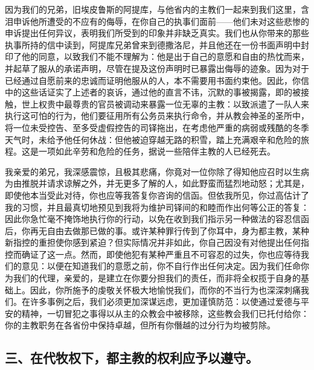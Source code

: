 因为我们的兄弟，旧埃皮鲁斯的阿提库，与他省内的主教们一起来到我们这里，含泪申诉他所遭受的不应有的侮辱，在你自己的执事们面前——他们未对这些悲惨的申诉提出任何异议，表明我们所受到的印象并非缺乏真实。我们也从你带来的那些执事所持的信中读到，阿提库兄弟曾来到德撒洛尼，并且他还在一份书面声明中封印了他的同意，以致我们不能不理解为：他是出于自己的意愿和自由的热忱而来，并起草了服从的承诺声明，尽管在提及这份声明时已暴露出侮辱的迹象。因为对于已经通过自愿前来的忠诚而证明他服从的人，本不需要用书面约束他。因此，你信中的这些话证实了上述者的哀诉，通过他的直言不讳，沉默的事被揭露，即的被接触，世上权贵中最尊贵的官员被调动来暴露一位无辜的主教：以致派遣了一队人来执行这可怕的行为，他们要征用所有公务员来执行命令，并从教会神圣的圣所中，将一位未受控告、至多受虚假控告的司铎拖出，在考虑他严重的病弱或残酷的冬季天气时，未给予他任何休战：但他被迫穿越无路的积雪，踏上充满艰辛和危险的旅程。这是一项如此辛劳和危险的任务，据说一些陪伴主教的人已经死去。\par

我亲爱的弟兄，我深感震惊，且极其悲痛，你竟对一位你除了得知他应召时以生病为由推脱并请求谅解之外，并无更多了解的人，如此野蛮而猛烈地动怒；尤其是，即使他本当受此对待，你也应等我答复你咨询的信函。但依我所见，你过高估计了我的习惯，并且最真切地预见到我将为维护司铎间的和睦而作出何等公正的答复：因此你急忙毫不掩饰地执行你的行动，以免在收到我们指示另一种做法的容忍信函后，你再无自由去做那已做的事。或许某种罪行传到了你耳中，身为都主教，某种新指控的重担使你感到紧迫？但实际情况并非如此，你自己因没有对他提出任何指控而确证了这一点。然而，即使他犯有某种严重且不可容忍的过失，你也应等待我们的意见：以便在知道我们的意愿之前，你不自行作出任何决定。因为我们任命你为我们的代理，亲爱的，是建立在你要分担我们的责任，而非将全权揽于自身的基础上。因此，你所施予的虔敬关怀极大地愉悦我们，而你的不当行为也深深刺痛我们。在许多事例之后，我们必须更加深谋远虑，更加谨慎防范：以使通过爱德与平安的精神，一切冒犯之事得以从主的众教会中被移除，这些教会我们已托付给你：你的主教职务在各省份中保持卓越，但所有你僭越的过分行为均被剪除。\par


\subsection{三、在代牧权下，都主教的权利应予以遵守。}

